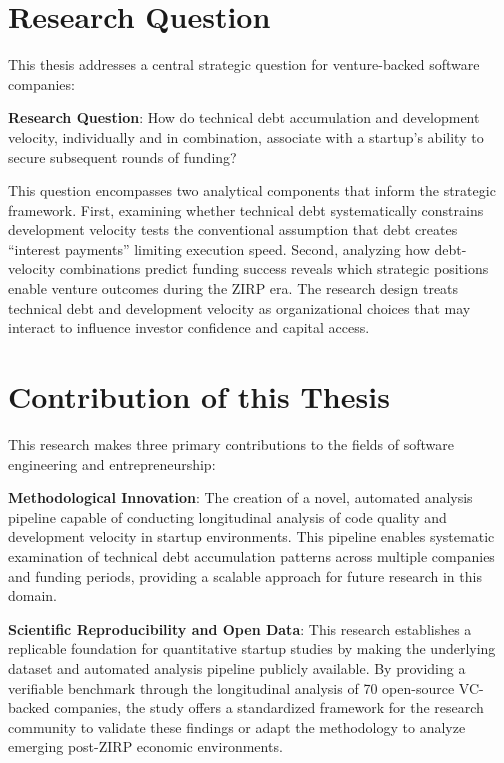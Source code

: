 \section{Research Question}\label{sec:research_questions}

This thesis addresses a central strategic question for venture-backed software companies:

\textbf{Research Question}: How do technical debt accumulation and development velocity, individually and in combination, associate with a startup's ability to secure subsequent rounds of funding?

This question encompasses two analytical components that inform the strategic framework. First, examining whether technical debt systematically constrains development velocity tests the conventional assumption that debt creates ``interest payments'' limiting execution speed. Second, analyzing how debt-velocity combinations predict funding success reveals which strategic positions enable venture outcomes during the ZIRP era. The research design treats technical debt and development velocity as organizational choices that may interact to influence investor confidence and capital access.

\section{Contribution of this Thesis}\label{sec:contribution}

This research makes three primary contributions to the fields of software engineering and entrepreneurship:

\textbf{Methodological Innovation}: The creation of a novel, automated analysis pipeline capable of conducting longitudinal analysis of code quality and development velocity in startup environments. This pipeline enables systematic examination of technical debt accumulation patterns across multiple companies and funding periods, providing a scalable approach for future research in this domain.

\textbf{Scientific Reproducibility and Open Data}: This research establishes a replicable foundation for quantitative startup studies by making the underlying dataset and automated analysis pipeline publicly available. By providing a verifiable benchmark through the longitudinal analysis of 70 open-source \ac{VC}-backed companies, the study offers a standardized framework for the research community to validate these findings or adapt the methodology to analyze emerging post-\ac{ZIRP} economic environments.

